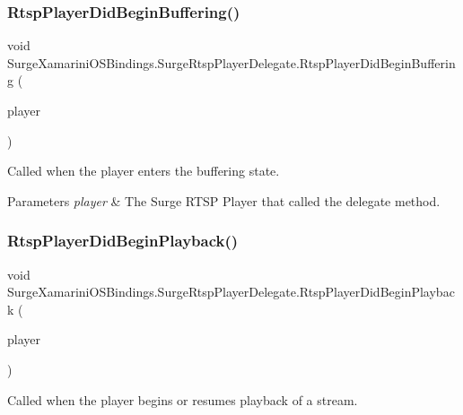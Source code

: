 \subsubsection{\texorpdfstring{Rtsp\+Player\+Did\+Begin\+Buffering()}{RtspPlayerDidBeginBuffering()}}
{\footnotesize\ttfamily void Surge\+Xamarini\+O\+S\+Bindings.\+Surge\+Rtsp\+Player\+Delegate.\+Rtsp\+Player\+Did\+Begin\+Buffering (\begin{DoxyParamCaption}\item[{\hyperlink{interface_surge_xamarini_o_s_bindings_1_1_surge_rtsp_player}{Surge\+Rtsp\+Player}}]{player }\end{DoxyParamCaption})}



Called when the player enters the buffering state. 


\begin{DoxyParams}{Parameters}
{\em player} & The Surge R\+T\+SP Player that called the delegate method.\\
\hline
\end{DoxyParams}
\mbox{\label{interface_surge_xamarini_o_s_bindings_1_1_surge_rtsp_player_delegate_ad4dabfca0a807a5d2e5edb1c0325379d}} 
\subsubsection{\texorpdfstring{Rtsp\+Player\+Did\+Begin\+Playback()}{RtspPlayerDidBeginPlayback()}}
{\footnotesize\ttfamily void Surge\+Xamarini\+O\+S\+Bindings.\+Surge\+Rtsp\+Player\+Delegate.\+Rtsp\+Player\+Did\+Begin\+Playback (\begin{DoxyParamCaption}\item[{\hyperlink{interface_surge_xamarini_o_s_bindings_1_1_surge_rtsp_player}{Surge\+Rtsp\+Player}}]{player }\end{DoxyParamCaption})}



Called when the player begins or resumes playback of a stream. 


